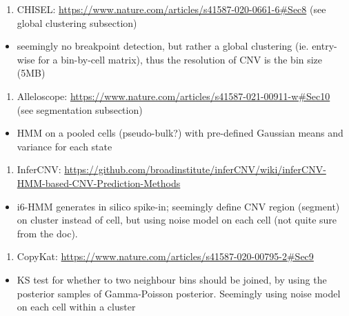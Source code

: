 \documentclass[
]{book}
\providecommand{\tightlist}{%
  \setlength{\itemsep}{0pt}\setlength{\parskip}{0pt}}
\begin{document}
\begin{enumerate}
\def\labelenumi{\arabic{enumi}.}
\tightlist
\item
  CHISEL: \url{https://www.nature.com/articles/s41587-020-0661-6\#Sec8} (see global clustering subsection)
\end{enumerate}

\begin{itemize}
\tightlist
\item
  seemingly no breakpoint detection, but rather a global clustering (ie. entry-wise for a bin-by-cell matrix), thus the resolution of CNV is the bin size (5MB)
\end{itemize}

\begin{enumerate}
\def\labelenumi{\arabic{enumi}.}
\setcounter{enumi}{1}
\tightlist
\item
  Alleloscope: \url{https://www.nature.com/articles/s41587-021-00911-w\#Sec10} (see segmentation subsection)
\end{enumerate}

\begin{itemize}
\tightlist
\item
  HMM on a pooled cells (pseudo-bulk?) with pre-defined Gaussian means and variance for each state
\end{itemize}

\begin{enumerate}
\def\labelenumi{\arabic{enumi}.}
\setcounter{enumi}{2}
\tightlist
\item
  InferCNV: \url{https://github.com/broadinstitute/inferCNV/wiki/inferCNV-HMM-based-CNV-Prediction-Methods}
\end{enumerate}

\begin{itemize}
\tightlist
\item
  i6-HMM generates in silico spike-in; seemingly define CNV region (segment) on cluster instead of cell, but using noise model on each cell (not quite sure from the doc).
\end{itemize}

\begin{enumerate}
\def\labelenumi{\arabic{enumi}.}
\setcounter{enumi}{3}
\tightlist
\item
  CopyKat: \url{https://www.nature.com/articles/s41587-020-00795-2\#Sec9}
\end{enumerate}

\begin{itemize}
\tightlist
\item
  KS test for whether to two neighbour bins should be joined, by using the posterior samples of Gamma-Poisson posterior. Seemingly using noise model on each cell within a cluster
\end{itemize}
\end{document}
